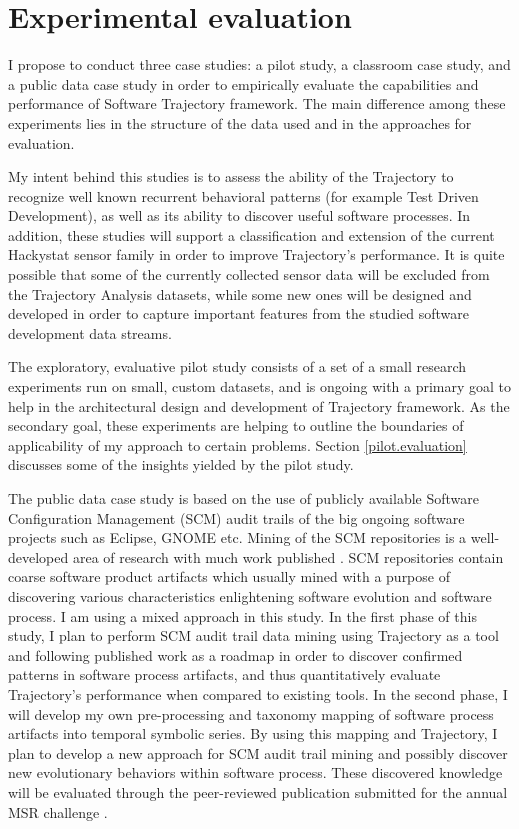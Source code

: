 \chapter{Experimental evaluation} \label{experiments}
I propose to conduct three case studies: a pilot study, a classroom case study, and a public data case study in order to empirically evaluate the capabilities and performance of Software Trajectory framework. The main difference among these experiments lies in the structure of the data used and in the approaches for evaluation. 

My intent behind this studies is to assess the ability of the Trajectory to recognize well known recurrent behavioral patterns (for example Test Driven Development), as well as its ability to discover useful software processes. In addition, these studies will support a classification and extension of the current Hackystat sensor family in order to improve Trajectory's performance. It is quite possible that some of the currently collected sensor data will be excluded from the Trajectory Analysis datasets, while some new ones will be designed and developed in order to capture important features from the studied software development data streams.

The exploratory, evaluative pilot study consists of a set of a small research experiments run on small, custom datasets, and is ongoing with a primary goal to help in the architectural design and development of Trajectory framework. As the secondary goal, these experiments are helping to outline the boundaries of applicability of my approach to certain problems. Section \ref{pilot.evaluation} discusses some of the insights yielded by the pilot study.

The public data case study is based on the use of publicly available Software Configuration Management (SCM) audit trails of the big ongoing software projects such as Eclipse, GNOME etc. Mining of the SCM repositories is a well-developed area of research with much work published \cite{citeulike:5043676}. SCM repositories contain coarse software product artifacts which usually mined with a purpose of discovering various characteristics enlightening software evolution and software process. I am using a mixed approach in this study. In the first phase of this study, I plan to perform SCM audit trail data mining using Trajectory as a tool and following published work as a roadmap in order to discover confirmed patterns in software process artifacts, and thus quantitatively evaluate Trajectory's performance when compared to existing tools. In the second phase, I will develop my own pre-processing and taxonomy mapping of software process artifacts into temporal symbolic series. By using this mapping and Trajectory, I plan to develop a new approach for SCM audit trail mining and possibly discover new evolutionary behaviors within software process. These discovered knowledge will be evaluated through the peer-reviewed publication submitted for the annual MSR challenge \cite{citeulike:5043676}.

